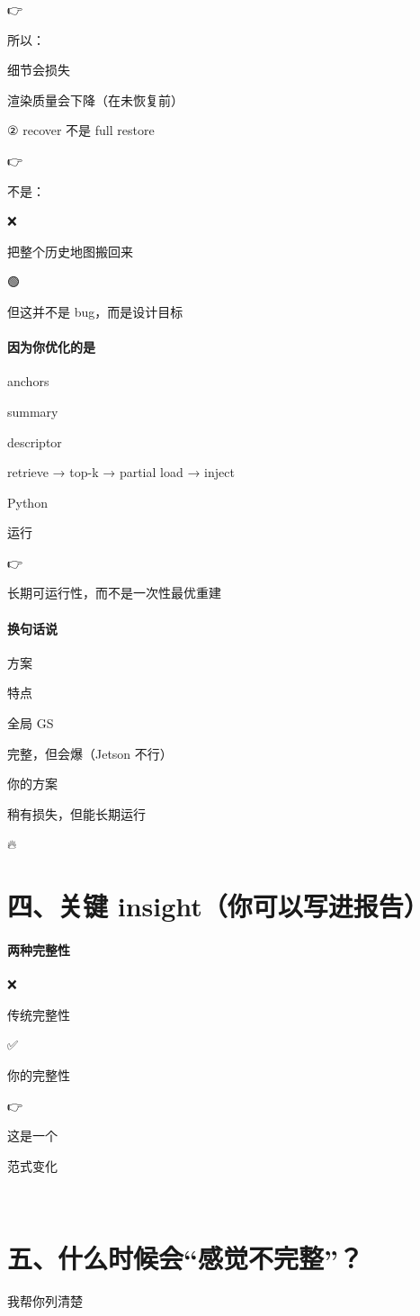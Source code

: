 \documentclass[12pt]{article}
\begin{document}
👉

所以：

细节会损失

渲染质量会下降（在未恢复前）

② recover 不是 full restore

👉

不是：

❌

把整个历史地图搬回来

🟢

但这并不是 bug，而是设计目标

\paragraph{因为你优化的是}
anchors

summary

descriptor

retrieve → top-k → partial load → inject

Python

运行

👉

长期可运行性，而不是一次性最优重建

\paragraph{换句话说}
方案

特点

全局 GS

完整，但会爆（Jetson 不行）

你的方案

稍有损失，但能长期运行

🔥

\section{四、关键 insight（你可以写进报告）}
\paragraph{两种完整性}
❌

传统完整性

✅

你的完整性

👉

这是一个

范式变化

🧩

\section{五、什么时候会“感觉不完整”？}
我帮你列清楚
\end{document}
